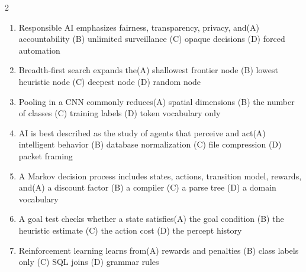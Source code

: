 \documentclass[a4paper]{article}
\begin{document}
\begin{multicols*}{2}
\begin{enumerate}[resume]
\item Responsible AI emphasizes fairness, transparency, privacy, and\newline\hspace*{0.6em}(A) accountability \quad (B) unlimited surveillance \newline\hspace*{0.6em}(C) opaque decisions \quad (D) forced automation
\item Breadth-first search expands the\newline\hspace*{0.6em}(A) shallowest frontier node \quad (B) lowest heuristic node \newline\hspace*{0.6em}(C) deepest node \quad (D) random node
\item Pooling in a CNN commonly reduces\newline\hspace*{0.6em}(A) spatial dimensions \quad (B) the number of classes \newline\hspace*{0.6em}(C) training labels \quad (D) token vocabulary only
\item AI is best described as the study of agents that perceive and act\newline\hspace*{0.6em}(A) intelligent behavior \quad (B) database normalization \newline\hspace*{0.6em}(C) file compression \quad (D) packet framing
\item A Markov decision process includes states, actions, transition model, rewards, and\newline\hspace*{0.6em}(A) a discount factor \quad (B) a compiler \newline\hspace*{0.6em}(C) a parse tree \quad (D) a domain vocabulary
\item A goal test checks whether a state satisfies\newline\hspace*{0.6em}(A) the goal condition \quad (B) the heuristic estimate \newline\hspace*{0.6em}(C) the action cost \quad (D) the percept history
\item Reinforcement learning learns from\newline\hspace*{0.6em}(A) rewards and penalties \quad (B) class labels only \newline\hspace*{0.6em}(C) SQL joins \quad (D) grammar rules

\end{enumerate}
\end{multicols*}
\end{document}
